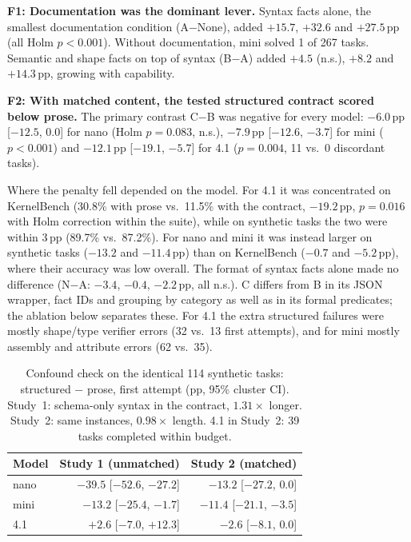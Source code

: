 \documentclass[conference]{IEEEtran}
\newcommand{\pp}{\,pp}
\begin{document}
\textbf{F1: Documentation was the dominant lever.} Syntax facts alone, the smallest documentation condition (A$-$None), added $+15.7$, $+32.6$ and $+27.5$\pp{} (all Holm $p<0.001$). Without documentation, mini solved 1 of 267 tasks. Semantic and shape facts on top of syntax (B$-$A) added $+4.5$ (n.s.), $+8.2$ and $+14.3$\pp, growing with capability.

\textbf{F2: With matched content, the tested structured contract scored below prose.} The primary contrast C$-$B was negative for every model: $-6.0$\pp{} [$-12.5$, $0.0$] for nano (Holm $p=0.083$, n.s.), $-7.9$\pp{} [$-12.6$, $-3.7$] for mini ($p<0.001$) and $-12.1$\pp{} [$-19.1$, $-5.7$] for 4.1 ($p=0.004$, 11 vs.\ 0 discordant tasks).

Where the penalty fell depended on the model. For 4.1 it was concentrated on KernelBench (30.8\% with prose vs.\ 11.5\% with the contract, $-19.2$\pp, $p=0.016$ with Holm correction within the suite), while on synthetic tasks the two were within 3\pp{} (89.7\% vs.\ 87.2\%). For nano and mini it was instead larger on synthetic tasks ($-13.2$ and $-11.4$\pp) than on KernelBench ($-0.7$ and $-5.2$\pp), where their accuracy was low overall. The format of syntax facts alone made no difference (N$-$A: $-3.4$, $-0.4$, $-2.2$\pp, all n.s.). C differs from B in its JSON wrapper, fact IDs and grouping by category as well as in its formal predicates; the ablation below separates these. For 4.1 the extra structured failures were mostly shape/type verifier errors (32 vs.\ 13 first attempts), and for mini mostly assembly and attribute errors (62 vs.\ 35).

\begin{table}[t]
\caption{Confound check on the identical 114 synthetic tasks: structured $-$ prose, first attempt (pp, 95\% cluster CI). Study~1: schema-only syntax in the contract, $1.31\times$ longer. Study~2: same instances, $0.98\times$ length. 4.1 in Study~2: 39 tasks completed within budget.}
\label{tab:confound}
\centering\footnotesize
\setlength{\tabcolsep}{4pt}
\begin{tabular}{lrr}
\toprule
Model & Study 1 (unmatched) & Study 2 (matched) \\
\midrule
nano & $-39.5$ [$-52.6$, $-27.2$] & $-13.2$ [$-27.2$, $0.0$] \\
mini & $-13.2$ [$-25.4$, $-1.7$] & $-11.4$ [$-21.1$, $-3.5$] \\
4.1 & $+2.6$ [$-7.0$, $+12.3$] & $-2.6$ [$-8.1$, $0.0$] \\
\bottomrule
\end{tabular}
\end{table}
\end{document}
